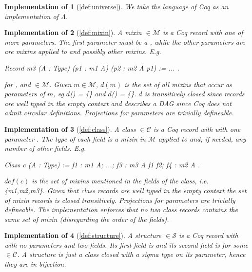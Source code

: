 \documentclass[a4paper,UKenglish,cleveref, autoref]{lipics-v2019}
\newcommand{\Lang}{\ensuremath{\Lambda}}
\newcommand{\mixin}{mixin}
\newcommand{\mixins}{mixins}
\newcommand{\M}{\ensuremath{\mathcal{M}}}
\newcommand{\depx}{\ensuremath{d}}
\newcommand{\C}{\ensuremath{\mathcal{C}}}
\newcommand{\class}{class}
\newcommand{\cdef}{\ensuremath{def}}
\newcommand{\Str}{\ensuremath{\mathcal{S}}}
\newcommand{\structure}{structure}
\theoremstyle{implem}
\newtheorem*{implementation}{Implementation of}
\theoremstyle{implem}
\theoremstyle{axiom}
\theoremstyle{abscommand}
\theoremstyle{command}
\begin{document}
\begin{implementation}[\autoref{def:universe}]
We take the language of Coq as an implementation of \Lang{}.
\end{implementation}

\begin{implementation}[\autoref{def:mixin}]
A \mixin{}  \(\in \M{}\) is a Coq record with one of more parameters.
The first parameter must be a , while the other parameters are
are \mixins{} applied to  and possibly other \mixins{}. E.g.
\begin{coqcode}
Record m3 (A : Type) (p1 : m1 A) (p2 : m2 A p1) := { ... }.
\end{coqcode}
for ,  and  \(\in \M{}\).
Given \(m \in \M{}\), \(\depx{}(m)\) is the set of all
\mixins{} that occur as parameters of \(m\), eg
\depx{}() = \{\} and \depx{}() = \{\}.
\depx{} is transitively closed since records are well typed
in the empty context and describes a DAG since Coq does not
admit circular definitions.
Projections for parameters are trivially defineable.
\end{implementation}

\begin{implementation}[\autoref{def:class}]
A \class{}  \(\in \C{}\) is a Coq record with with one parameter
. The type of each field is a \mixin{} in \M{} applied to
 and, if needed, any number of other fields. E.g.
\begin{coqcode}
Class c (A : Type) := { f1 : m1 A; ...; f3 : m3 A f1 f2; f4 : m2 A }.
\end{coqcode}
\(\cdef{}(c)\) is the set of \mixins{} mentioned in the fields of the \class{},
i.e. \{m1,m2,m3\}.
Given that \class{} records are well typed in the empty context
the set of \mixin{} records is closed transitively.
Projections for parameters are trivially defineable.
The implementation enforces that no two
\class{} records contains the same set of
\mixin{} (disregarding the order of the fields).
\end{implementation}

\begin{implementation}[\autoref{def:structure}]
A \structure{}  \(\in \Str{}\) is a Coq record with with no parameters
and two fields. Its first field is  and its second field is
 for some  \(\in \C{}\).
A structure is just a class closed with a sigma type on its parameter, hence
they are in bijection.
\end{implementation}
\end{document}
